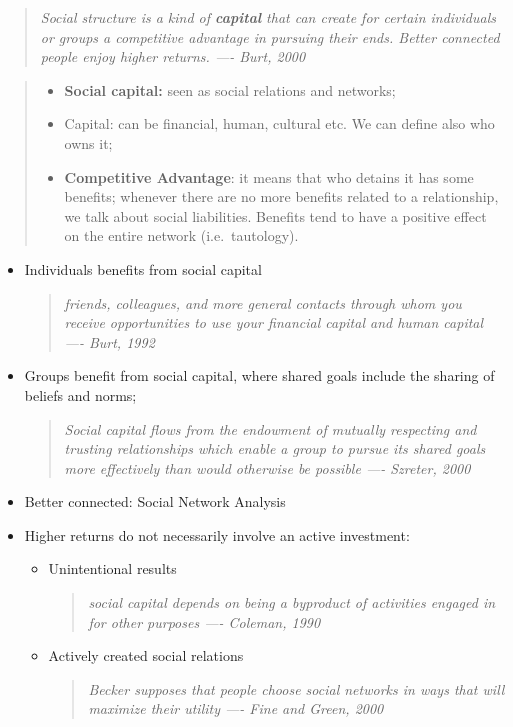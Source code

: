 \documentclass[
  notitlepage,
  onecolumn,
  openany]{book}
\providecommand{\tightlist}{%
  \setlength{\itemsep}{0pt}\setlength{\parskip}{0pt}}
\begin{document}
\begin{quote}
\emph{Social structure is a kind of \textbf{capital} that can create for certain individuals or groups a competitive advantage in pursuing their ends. Better connected people enjoy higher returns.
---- Burt, 2000}
\end{quote}

\begin{quote}
\begin{itemize}
\tightlist
\item
  \textbf{Social capital:} seen as social relations and networks;
\item
  Capital: can be financial, human, cultural etc. We can define also who owns it;
\item
  \textbf{Competitive Advantage}: it means that who detains it has some benefits; whenever there are no more benefits related to a relationship, we talk about social liabilities. Benefits tend to have a positive effect on the entire network (i.e.~tautology).
\end{itemize}
\end{quote}

\begin{itemize}
\item
  Individuals benefits from social capital

  \begin{quote}
  \emph{friends, colleagues, and more general contacts through whom you
  receive opportunities to use your financial capital and human capital
  ---- Burt, 1992}
  \end{quote}
\item
  Groups benefit from social capital, where shared goals include the sharing of beliefs and norms;

  \begin{quote}
  \emph{Social capital flows from the endowment of mutually respecting and
  trusting relationships which enable a group to pursue its shared goals
  more effectively than would otherwise be possible
  ---- Szreter, 2000}
  \end{quote}
\item
  Better connected: Social Network Analysis
\item
  Higher returns do not necessarily involve an active investment:

  \begin{itemize}
  \item
    Unintentional results

    \begin{quote}
    \emph{social capital depends on being a byproduct of activities
    engaged in for other purposes
    ---- Coleman, 1990}
    \end{quote}
  \item
    Actively created social relations

    \begin{quote}
    \emph{Becker supposes that people choose social networks in ways
    that will maximize their utility
    ---- Fine and Green, 2000}
    \end{quote}
  \end{itemize}
\end{itemize}
\end{document}
